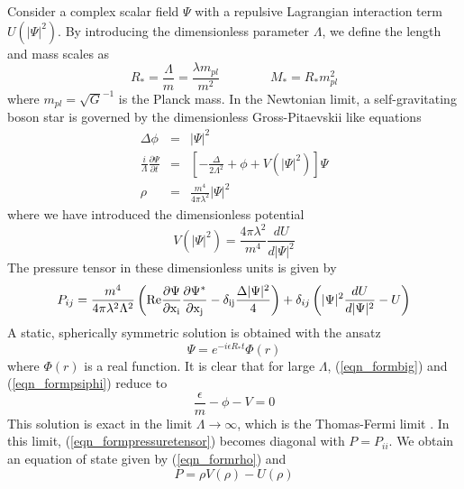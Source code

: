 Consider a complex scalar field $\Psi$ with a repulsive Lagrangian interaction term $U(|\Psi|^2)$. By introducing the dimensionless
parameter $\Lambda$, we define the length and mass scales as
\begin{equation}
	R_*=\frac{\Lambda}{m}=\frac{\lambda m_{pl}}{m^2} \qquad \qquad M_*=R_*m^2_{pl}
	\label{eqn_formscales}
\end{equation}
where $m_{pl}=\sqrt{G}^{-1}$ is the Planck mass. In the Newtonian limit, a self-gravitating boson star is governed by the
dimensionless Gross-Pitaevskii like equations
\begin{eqnarray}
	\Delta \phi &=& |\Psi|^2 \label{eqn_formpoisson} \\
	\frac{i}{\Lambda} \frac{\partial \Psi}{\partial t} &=& \left[ -\frac{\Delta}{2\Lambda^2} + \phi + V(|\Psi|^2) \right]
		\Psi \label{eqn_formbig} \\
	\rho &=& \frac{m^4}{4\pi \lambda^2} |\Psi|^2 \label{eqn_formrho}
\end{eqnarray}
where we have introduced the dimensionless potential
\begin{equation}
	V(|\Psi|^2) = \frac{4\pi \lambda^2}{m^4}\frac{dU}{d|\Psi|^2}
	\label{eqn_formv}
\end{equation}
The pressure tensor in these dimensionless units is given by
\begin{equation}
	P_{ij}= \frac{m^4}{4\pi\lambda^2 \Lambda^2}
		\left( \rm{Re}\frac{\partial\Psi}{\partial x_i} \frac{\partial\Psi^*}{\partial x_j}
			-\delta_{ij}\frac{\Delta|\Psi|^2}{4} \right)
		+\delta_{ij}\left(|\Psi|^2\frac{d U}{d |\Psi|^2} -U \right)
	\label{eqn_formpressuretensor}
\end{equation}
A static, spherically symmetric solution is obtained with the ansatz
\begin{equation}
	\Psi = e^{- i \epsilon R_* t} \Phi(r)
	\label{eqn_formpsiphi}
\end{equation}
where $\Phi(r)$ is a real function. It is clear that for large $\Lambda$, (\ref{eqn_formbig}) and (\ref{eqn_formpsiphi}) reduce to
\begin{equation}
	\frac{\epsilon}{m} - \phi - V = 0
	\label{eqn_formereduce}
\end{equation}
This solution is exact in the limit $\Lambda \rightarrow \infty$, which is the Thomas-Fermi limit \cite{ref_bosonformtf}. In this limit,
(\ref{eqn_formpressuretensor}) becomes diagonal with $P = P_{ii}$. We obtain an equation of state given by (\ref{eqn_formrho}) and
\begin{equation}
	P=\rho V(\rho) - U(\rho)
	\label{eqn_formpressure}
\end{equation}
